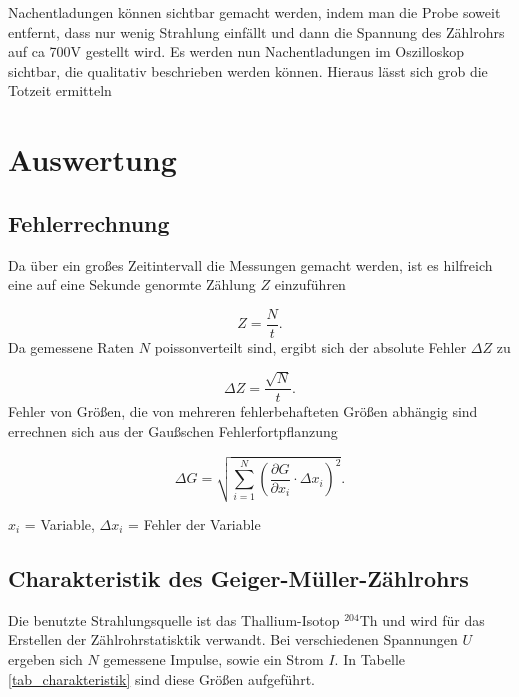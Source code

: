 Nachentladungen können sichtbar gemacht werden, indem man die Probe soweit entfernt, dass nur wenig Strahlung einfällt und dann die 
Spannung des Zählrohrs auf ca 700V gestellt wird. Es werden nun Nachentladungen im Oszilloskop sichtbar, die qualitativ beschrieben 
werden können. Hieraus lässt sich grob die Totzeit ermitteln

\section{Auswertung}
\subsection{Fehlerrechnung}
Da über ein großes Zeitintervall die Messungen gemacht werden, ist es hilfreich eine auf eine Sekunde genormte Zählung $Z$ einzuführen

\begin{equation}
 Z = \frac{N}{t}.
\end{equation}
Da gemessene Raten $N$ poissonverteilt sind, ergibt sich der absolute Fehler $\Delta Z$ zu

\begin{equation}
 \Delta Z = \frac{\sqrt{N}}{t}.
\end{equation}
Fehler von Größen, die von mehreren fehlerbehafteten Größen abhängig sind errechnen sich aus der Gaußschen Fehlerfortpflanzung

\begin{formel}[H]
\begin{equation}
\Delta G = \sqrt{\sum_{i=1}^{N}\left( \frac{\partial G}{\partial x_i}\cdot \Delta x_i\right)^2}.
\label{eq_gauss}
\end{equation}
\caption*{\small{$x_i$ = Variable, $\Delta x_i$ = Fehler der Variable}}
\end{formel}

\subsection{Charakteristik des Geiger-Müller-Zählrohrs}
Die benutzte Strahlungsquelle ist das Thallium-Isotop $^{204}$Th und wird für das Erstellen der Zählrohrstatisktik verwandt. Bei 
verschiedenen Spannungen $U$ ergeben sich $N$ gemessene Impulse, sowie ein Strom $I$. In Tabelle \ref{tab_charakteristik} sind diese
Größen aufgeführt.

